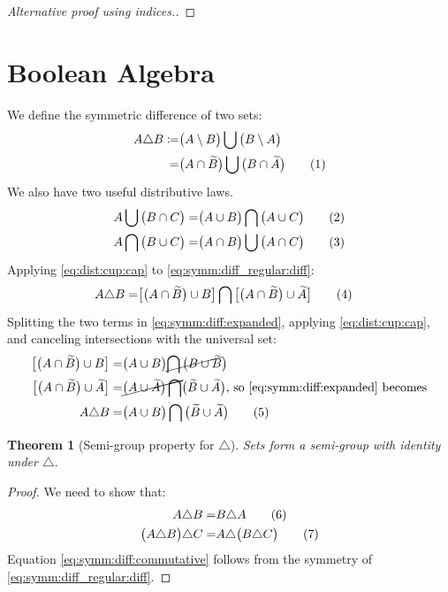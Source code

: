 \documentclass[]{article}
\newcommand\numberthis{\addtocounter{equation}{1}\tag{\theequation}}
\newcommand{\stcomp}[1]{\widetilde{#1}}
\newtheorem{thm}{Theorem}
\begin{document}
\begin{appendices}
\begin{proof}[Alternative proof using indices.]
	\end{proof}
	
	\section{Boolean Algebra}
	We define the symmetric difference of two sets:
	\begin{align*}
		A \triangle B \coloneqq& \big(A \setminus B\big) \bigcup \big(B \setminus  A\big)\\
		=& \big(A \cap \stcomp{B}\big) \bigcup \big(B \cap \stcomp{A}\big) \numberthis \label{eq:symm:diff_regular:diff}\\
	\end{align*}
	We also have two useful distributive laws.
	\begin{align*}
		A \bigcup \big(B \cap C \big) =& \big(A \cup B\big) \bigcap  \big(A \cup C\big) \numberthis \label{eq:dist:cup:cap}\\
		A \bigcap \big(B \cup C \big) =& \big(A \cap B\big) \bigcup  \big(A \cap C\big)	\numberthis \label{eq:dist:cap:cup}	
	\end{align*}
	Applying \eqref{eq:dist:cup:cap} to \eqref{eq:symm:diff_regular:diff}:
	\begin{align*}
		A \triangle B =&\big[\big(A \cap \stcomp{B}\big) \cup B\big] \bigcap \big[ \big(A \cap \stcomp{B}\big) \cup \stcomp A \big] \numberthis \label{eq:symm:diff:expanded}
	\end{align*}
	Splitting the two terms in \eqref{eq:symm:diff:expanded}, applying \eqref{eq:dist:cup:cap}, and canceling intersections with the universal set:
	\begin{align*}
		\big[\big(A \cap \stcomp{B}\big) \cup B\big] =& \big(A \cup B\big) \cancel{\bigcap \big(B \cup \stcomp{B}}\big)\\
		\big[ \big(A \cap \stcomp{B}\big) \cup \stcomp A \big] =& \cancel{\big(A\cup\stcomp{A} \big) \bigcap} \big(\stcomp{B} \cup\stcomp{A}\big) \text{, so \eqref{eq:symm:diff:expanded} becomes}\\
		A \triangle B =& \big(A \cup B\big) \bigcap \big(\stcomp{B} \cup\stcomp{A}\big) \numberthis \label{eq:symm:diff:without:diff}
	\end{align*}

	\begin{thm}[Semi-group property for $\triangle$]
		Sets form a semi-group with identity under $\triangle$.
	\end{thm}
	\begin{proof}
		We need to show that:
		\begin{align*}
			A \triangle B =& B \triangle A \numberthis \label{eq:symm:diff:commutative}\\
			\big(A \triangle B\big) \triangle C =& A \triangle \big(B \triangle C\big) \numberthis \label{eq:symm:diff:associative}
		\end{align*}
		Equation \eqref{eq:symm:diff:commutative} follows from the symmetry of \eqref{eq:symm:diff_regular:diff}.
		

\end{proof}
\end{appendices}
\end{document}
